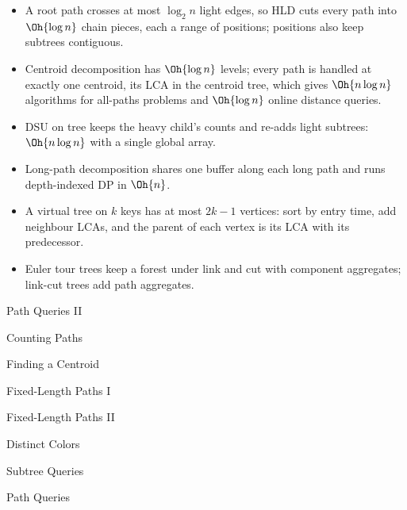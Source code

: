 \begin{summary}
\begin{itemize}
  \item A root path crosses at most $\log_2 n$ light edges, so HLD cuts every path into $\Oh{\log n}$ chain pieces, each a range of
        positions; positions also keep subtrees contiguous.
  \item Centroid decomposition has $\Oh{\log n}$ levels; every path is handled at exactly one centroid, its LCA in the centroid
        tree, which gives $\Oh{n \log n}$ algorithms for all-paths problems and $\Oh{\log n}$ online distance queries.
  \item DSU on tree keeps the heavy child's counts and re-adds light subtrees: $\Oh{n \log n}$ with a single global array.
  \item Long-path decomposition shares one buffer along each long path and runs depth-indexed DP in $\Oh{n}$.
  \item A virtual tree on $k$ keys has at most $2k - 1$ vertices: sort by entry time, add neighbour LCAs, and the parent of each
        vertex is its LCA with its predecessor.
  \item Euler tour trees keep a forest under link and cut with component aggregates; link-cut trees add path aggregates.
\end{itemize}
\end{summary}

\begin{practice}
\begin{pplist}
  \item Path Queries II
  \item Counting Paths
  \item Finding a Centroid
  \item Fixed-Length Paths I
  \item Fixed-Length Paths II
\end{pplist}
\begin{pplist}
  \item Distinct Colors
  \item Subtree Queries
  \item Path Queries
\end{pplist}
\end{practice}
